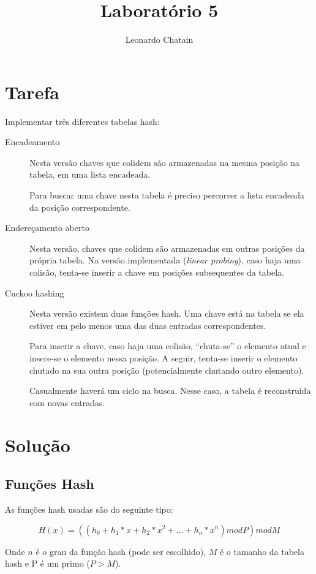 \documentclass{article}
\title{Laboratório 5}
\author{Leonardo Chatain}
\begin{document}
\maketitle

\section{Tarefa}
Implementar três diferentes tabelas hash:

\begin{description}
 \item[Encadeamento] Nesta versão chaves que colidem são armazenadas na mesma posição na
tabela, em uma lista encadeada.

Para buscar uma chave nesta tabela é preciso percorrer a lista encadeada da posição
correspondente.

 \item[Endereçamento aberto] Nesta versão, chaves que colidem são armazenadas em outras
posições da própria tabela. Na versão implementada (\emph{linear probing}), caso haja uma colisão,
tenta-se inserir a chave em posições subsequentes da tabela.

 \item[Cuckoo hashing] Nesta versão existem duas funções hash. Uma chave está na tabela se ela
estiver em pelo menos uma das duas entradas correspondentes.

Para inserir a chave, caso haja uma colisão, ``chuta-se'' o elemento atual e insere-se o elemento
nessa posição. A seguir, tenta-se inserir o elemento chutado na sua outra posição (potencialmente
chutando outro elemento).

Casualmente haverá um ciclo na busca. Nesse caso, a tabela é reconstruida com novas entradas.

\end{description}

\section{Solução}

\subsection{Funções Hash}

As funções hash usadas são do seguinte tipo:

$$ H(x) = ((h_0 + h_1 * x + h_2 * x^2 + ... + h_n * x^n) mod P) mod M $$

Onde $n$ é o grau da função hash (pode ser escolhido), $M$ é o tamanho da tabela hash e P é um
primo ($P > M$).
\end{document}
